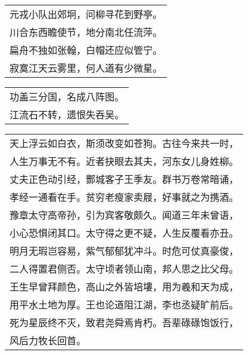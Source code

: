 \nopagebreak%
\nopagebreak%
\noindent\begin{minipage}{\linewidth}
  \vskip-3pt\begin{table}[H]
    \centering
    \begin{tabular}{@{}l@{}}
元戎小队出郊坰，问柳寻花到野亭。\\
川合东西瞻使节，地分南北任流萍。\\
扁舟不独如张翰，白帽还应似管宁。\\
寂寞江天云雾里，何人道有少微星。
    \end{tabular}
  \end{table}
\end{minipage}
\vspace{1cm}


\nopagebreak%
\nopagebreak%
\noindent\begin{minipage}{\linewidth}
  \vskip-3pt\begin{table}[H]
    \centering
    \begin{tabular}{@{}l@{}}
功盖三分国，名成八阵图。\\
江流石不转，遗恨失吞吴。
    \end{tabular}
  \end{table}
\end{minipage}
\vspace{1cm}


\nopagebreak%
\nopagebreak%
\noindent\begin{minipage}{\linewidth}
  \vskip-3pt\begin{table}[H]
    \centering
    \begin{tabular}{@{}l@{}}
天上浮云如白衣，斯须改变如苍狗。古往今来共一时，\\
人生万事无不有。近者抉眼去其夫，河东女儿身姓柳。\\
丈夫正色动引经，酆城客子王季友。群书万卷常暗诵，\\
孝经一通看在手。贫穷老瘦家卖屐，好事就之为携酒。\\
豫章太守高帝孙，引为宾客敬颇久。闻道三年未曾语，\\
小心恐惧闭其口。太守得之更不疑，人生反覆看亦丑。\\
明月无瑕岂容易，紫气郁郁犹冲斗。时危可仗真豪俊，\\
二人得置君侧否。太守顷者领山南，邦人思之比父母。\\
王生早曾拜颜色，高山之外皆培塿，用为羲和天为成，\\
用平水土地为厚。王也论道阻江湖，李也丞疑旷前后。\\
死为星辰终不灭，致君尧舜焉肯朽。吾辈碌碌饱饭行，\\
风后力牧长回首。
    \end{tabular}
  \end{table}
\end{minipage}
\vspace{1cm}


